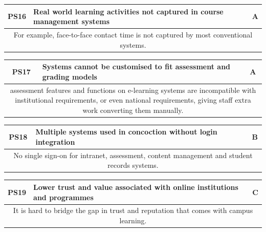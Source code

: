 \begin{table}[!ht]
	\begin{tabularx}{\textwidth}{|c|X|c|}
		\hline
		PS16 & \textbf{Real world learning activities not captured in course management systems} & A \\
		\hline
        \multicolumn{3}{|X|}{For example, face-to-face contact time is not captured by most conventional systems.}                      \\
		\hline
	\end{tabularx}
\end{table}

\begin{table}[!ht]
	\begin{tabularx}{\textwidth}{|c|X|c|}
		\hline
		PS17 & \textbf{Systems cannot be customised to fit assessment and grading models} & A \\
		\hline
        \multicolumn{3}{|X|}{assessment features and functions on e-learning systems are incompatible 
        with institutional requirements, or even national requirements, giving staff extra work converting them manually.}                      \\
		\hline
	\end{tabularx}
\end{table}

\begin{table}[!ht]
	\begin{tabularx}{\textwidth}{|c|X|c|}
		\hline
		PS18 & \textbf{Multiple systems used in concoction without login integration} & B \\
		\hline
        \multicolumn{3}{|X|}{No single sign-on for intranet, assessment, content management and student records systems.}                      \\
		\hline
	\end{tabularx}
\end{table}

\begin{table}[!ht]
	\begin{tabularx}{\textwidth}{|c|X|c|}
		\hline
		PS19 & \textbf{Lower trust and value associated with online institutions and programmes} & C \\
		\hline
        \multicolumn{3}{|X|}{It is hard to bridge the gap in trust and reputation that comes with campus learning.}                      \\
		\hline
	\end{tabularx}
\end{table}


